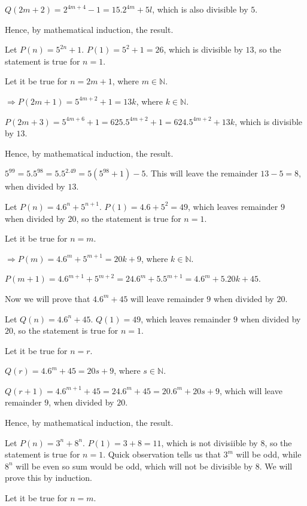   $Q(2m + 2) = 2^{4m + 4} - 1 = 15.2^{4m} + 5l$, which is also divisible by $5$.

  Hence, by mathematical induction, the result.
\item Let $P(n) = 5^{2n} + 1$. $P(1) = 5^2 + 1 = 26$, which is divisible by $13$, so the statement is true
  for $n = 1$.

  Let it be true for $n = 2m + 1$, where $m\in\mathbb{N}$.

  $\Rightarrow P(2m + 1) = 5^{4m + 2} + 1 = 13k$, where $k\in\mathbb{N}$.

  $P(2m + 3) = 5^{4m + 6} + 1 = 625.5^{4m + 2} + 1 = 624.5^{4m + 2} + 13k$, which is divisible by $13$.

  Hence, by mathematical induction, the result.

  $5^{99} = 5.5^{98} = 5.5^{2.49} = 5(5^{98} + 1) - 5$. This will leave the remainder $13 - 5 = 8$, when
  divided by $13$.
\item Let $P(n) = 4.6^n + 5^{n + 1}$. $P(1) = 4.6 + 5^2 = 49$, which leaves remainder $9$ when divided by
  $20$, so the statement is true for $n = 1$.

  Let it be true for $n = m$.

  $\Rightarrow P(m) = 4.6^m + 5^{m + 1} = 20k + 9$, where $k\in\mathbb{N}$.

  $P(m + 1) = 4.6^{m + 1} + 5^{m + 2} = 24.6^m + 5.5^{m + 1} = 4.6^m + 5.20k + 45$.

  Now we will prove that $4.6^m + 45$ will leave remainder $9$ when divided by $20$.

  Let $Q(n) = 4.6^n + 45$. $Q(1) = 49$, which leaves remainder $9$ when divided by $20$, so the statement is
  true for $n = 1$.

  Let it be true for $n = r$.

  $Q(r) = 4.6^m + 45 = 20s + 9$, where $s\in\mathbb{N}$.

  $Q(r + 1) = 4.6^{m + 1} + 45 = 24.6^m + 45 = 20.6^m + 20s + 9$, which will leave remainder $9$, when
  divided by $20$.

  Hence, by mathematical induction, the result.
\item Let $P(n) = 3^n + 8^n$. $P(1) = 3 + 8 = 11$, which is not divisiible by $8$, so the statement is true
  for $n = 1$. Quick observation tells us that $3^m$ will be odd, while $8^n$ will be even so sum would be
  odd, which will not be divisible by $8$. We will prove this by induction.

  Let it be true for $n = m$.

